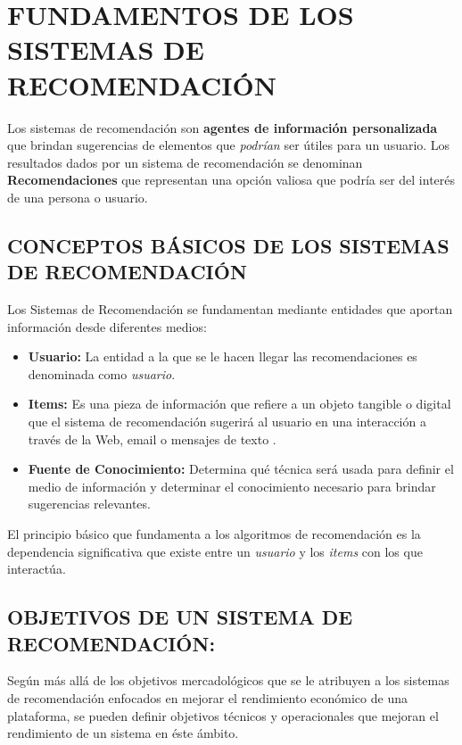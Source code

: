 \section{FUNDAMENTOS DE LOS SISTEMAS DE RECOMENDACIÓN }

Los sistemas de recomendación son \textbf{agentes de información personalizada} que brindan sugerencias de elementos que \textit{podrían} ser útiles para un usuario.  Los resultados dados por un sistema de recomendación se denominan \textbf{Recomendaciones} que representan una opción valiosa que podría ser del interés de una persona o usuario.

\subsection[CONCEPTOS BÁSICOS]{CONCEPTOS BÁSICOS DE LOS SISTEMAS DE RECOMENDACIÓN }


Los Sistemas de Recomendación se fundamentan mediante entidades que aportan información desde diferentes medios:

\begin{itemize}
    \item \textbf{Usuario: } La entidad a la que se le hacen llegar las recomendaciones es denominada como \textit{usuario}. 
    \item \textbf{Items: } Es una pieza de información que refiere a un objeto tangible o digital que el sistema de recomendación sugerirá al usuario en una interacción a través de la Web, email o mensajes de texto \parencite{Kotkov2020Serendipity}.
    \item \textbf{Fuente de Conocimiento: } Determina qué técnica será usada para definir el medio de información y determinar el conocimiento necesario para brindar sugerencias relevantes.
\end{itemize}

El principio básico que fundamenta a los algoritmos de recomendación es la dependencia significativa que existe entre un \textit{usuario} y los \textit{items} con los que interactúa.

\subsection[OBJETIVOS GENERALES]{OBJETIVOS DE UN SISTEMA DE RECOMENDACIÓN: }

Según \parencite{Aggarwal2016} más allá de los objetivos mercadológicos que se le atribuyen a los sistemas de recomendación enfocados en mejorar el rendimiento económico de una plataforma, se pueden definir objetivos técnicos y operacionales que mejoran el rendimiento de un sistema en éste ámbito.

